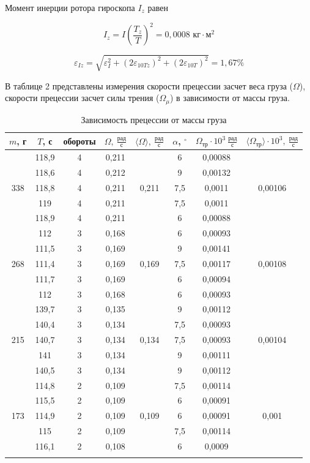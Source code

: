 \documentclass[a4paper, 12pt]{article}
\begin{document}
Момент инерции ротора гироскопа $I_z$ равен

\[ I_z = I \left( \frac{T_z}{T} \right) ^2 = 0,0008 \text{ кг$\cdot$м$^2$}\]

\[ \varepsilon_{Iz} = \sqrt{ \varepsilon_I^2 + (2\varepsilon_{10Tz})^2 + (2\varepsilon_{10T})^2} = 1,67\%\]

В таблице 2 представлены измерения скорости прецессии засчет веса груза ($\Omega$), скорости прецессии засчет силы трения ($\Omega_{\mu}$) в зависимости от массы груза.
\newpage
\begin{longtable}[H]{|c|c|c|c|c||c|c|c|}
			\hline
			$m$, г & $T$, с & обороты & $\Omega,\: \frac{\text{рад}}{\text{с}} $ & $\langle \Omega \rangle,\: \frac{\text{рад}}{\text{с}}$ & $\alpha$, $^{\circ}$ & $\Omega_{\text{тр}} \cdot 10^3\: \frac{\text{рад}}{\text{с}}$ & $ \langle \Omega_{\text{тр}} \rangle \cdot 10^{3},\: \frac{\text{рад}}{\text{с}}$ \\
			\hline
			& 118,9 & 4 & 0,211 &  & 6 & 0,00088 &  \\
			& 118,6 & 4 & 0,212 &  & 9 & 0,00132 &  \\
			338 & 118,8 & 4 & 0,211 & 0,211 & 7,5 & 0,0011 & 0,00106 \\
			& 119 & 4 & 0,211 &  & 7,5 & 0,0011 &  \\
			& 118,9 & 4 & 0,211 &  & 6 & 0,00088 &  \\
			\hline
			& 112 & 3 & 0,168 &  & 6 & 0,00093 &  \\
			& 111,5 & 3 & 0,169 &  & 9 & 0,00141 &  \\
			268 & 111,4 & 3 & 0,169 & 0,169 & 7,5 & 0,00117 & 0,00108 \\
			& 111,7 & 3 & 0,169 &  & 6 & 0,00094 &  \\
			& 112 & 3 & 0,168 &  & 6 & 0,00093 &  \\
			\hline
			& 139,7 & 3 & 0,135 &  & 9 & 0,00112 &  \\
			& 140,4 & 3 & 0,134 &  & 7,5 & 0,00093 &  \\
			215 & 140,7 & 3 & 0,134 & 0,134 & 7,5 & 0,00093 & 0,00104 \\
			& 141 & 3 & 0,134 &  & 9 & 0,00111 &  \\
			& 140,5 & 3 & 0,134 &  & 9 & 0,00112 &  \\
			\hline
			& 114,8 & 2 & 0,109 &  & 7,5 & 0,00114 &  \\
			& 115,5 & 2 & 0,109 &  & 6 & 0,00091 &  \\
			173 & 114,9 & 2 & 0,109 & 0,109 & 6 & 0,00091 & 0,001 \\
			& 115 & 2 & 0,109 &  & 7,5 & 0,00114 &  \\
			& 116,1 & 2 & 0,108 &  & 6 & 0,0009 &  \\
                \hline
            \caption{Зависимость прецессии от массы груза}
		\end{longtable}
  
\end{document}
